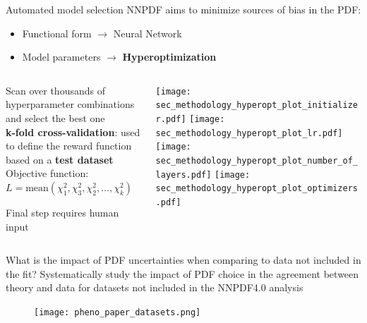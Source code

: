 \begin{frame}[t]{Automated model selection}
  NNPDF aims to minimize sources of bias in the PDF:
  \begin{itemize}
      \item Functional form $\rightarrow$ Neural Network
      \item Model parameters $\rightarrow$ \textbf{Hyperoptimization}
  \end{itemize}
    \begin{columns}
        \begin{column}{0.48\textwidth}
            Scan over thousands of hyperparameter combinations and select the best one \\
            \vspace*{0.8em}
            {\bf k-fold cross-validation}: used to define the reward function based on a {\bf test dataset}\\
            \vspace*{0.8em}
            Objective function: \\
            $L=\textrm{mean}(\chi_1^2,\chi_3^2,\chi_2^2,\ldots, \chi_k^2)$

            \vspace*{0.3cm}
            Final step requires human input
        \end{column}
        \begin{column}{0.48\textwidth}
            \begin{center}
                \texttt{[image: sec\_methodology\_hyperopt\_plot\_initializer.pdf]}
                \texttt{[image: sec\_methodology\_hyperopt\_plot\_lr.pdf]} \\
                \texttt{[image: sec\_methodology\_hyperopt\_plot\_number\_of\_layers.pdf]}
                \texttt{[image: sec\_methodology\_hyperopt\_plot\_optimizers.pdf]}
            \end{center}
        \end{column}
    \end{columns}
\end{frame}

\begin{frame}{What is the impact of PDF uncertainties when comparing to data not included in the fit?}
  Systematically study the impact of PDF choice in the agreement between theory and data for datasets not included in the NNPDF4.0 analysis

  \begin{figure}
    \texttt{[image: pheno\_paper\_datasets.png]}
  \end{figure}

\end{frame}

